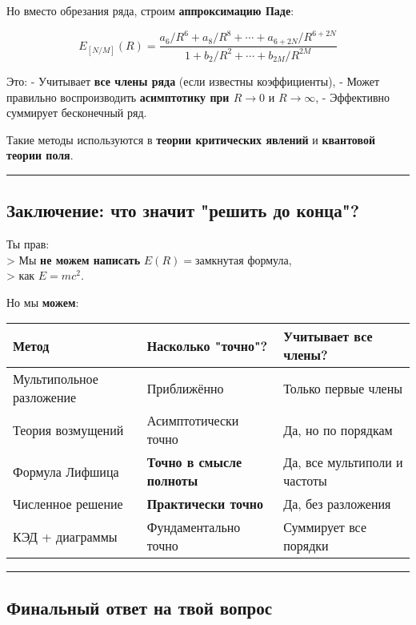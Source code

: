 \documentclass[11pt]{article}
\begin{document}
Но вместо обрезания ряда, строим \textbf{аппроксимацию Паде}:

\[
E_{[N/M]}(R) = \frac{ a_6/R^6 + a_8/R^8 + \cdots + a_{6+2N}/R^{6+2N} }{ 1 + b_2/R^2 + \cdots + b_{2M}/R^{2M} }
\]

Это: - Учитывает \textbf{все члены ряда} (если известны коэффициенты), -
Может правильно воспроизводить \textbf{асимптотику при \(R \to 0\)} и
\(R \to \infty\), - Эффективно суммирует бесконечный ряд.

Такие методы используются в \textbf{теории критических явлений} и
\textbf{квантовой теории поля}.

\begin{center}\rule{0.5\linewidth}{\linethickness}\end{center}

\subsection{Заключение: что значит "решить до
конца"?}\label{ux437ux430ux43aux43bux44eux447ux435ux43dux438ux435-ux447ux442ux43e-ux437ux43dux430ux447ux438ux442-ux440ux435ux448ux438ux442ux44c-ux434ux43e-ux43aux43eux43dux446ux430}

Ты прав:\\
\textgreater{} Мы \textbf{не можем написать}
\(E(R) = \text{замкнутая формула}\),\\
\textgreater{} как \(E = mc^2\).

Но мы \textbf{можем}:

\begin{longtable}[]{@{}lll@{}}
\toprule
Метод & Насколько "точно"? & Учитывает все члены?\tabularnewline
\midrule
\endhead
Мультипольное разложение & Приближённо & Только первые
члены\tabularnewline
Теория возмущений & Асимптотически точно & Да, но по
порядкам\tabularnewline
Формула Лифшица & \textbf{Точно в смысле полноты} & Да, все мультиполи и
частоты\tabularnewline
Численное решение & \textbf{Практически точно} & Да, без
разложения\tabularnewline
КЭД + диаграммы & Фундаментально точно & Суммирует все
порядки\tabularnewline
\bottomrule
\end{longtable}

\begin{center}\rule{0.5\linewidth}{\linethickness}\end{center}

\subsection{Финальный ответ на твой
вопрос}\label{ux444ux438ux43dux430ux43bux44cux43dux44bux439-ux43eux442ux432ux435ux442-ux43dux430-ux442ux432ux43eux439-ux432ux43eux43fux440ux43eux441}
\end{document}
